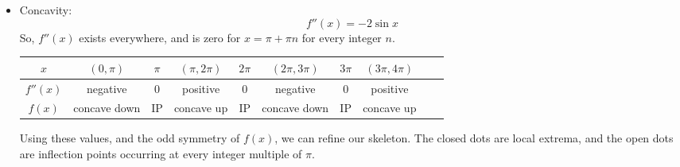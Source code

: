 \begin{solution}
\begin{itemize}
\item Concavity:
\[f''(x)=-2\sin x\]
So, $f''(x)$ exists everywhere, and is zero for $x=\pi+\pi n$ for every integer $n$.
\begin{center}
\begin{tabular}{|c||c|c|c|c|c|c|c|c|c|}
\hline
$x$&$\left(0,\pi\right)$&$\pi$&$\left(\pi,2\pi\right)$
&$2\pi$&$\left(2\pi,3\pi\right)$
&$3\pi$&$\left(3\pi,4\pi\right)$\\
\hline
$f''(x)$&negative&0&positive&0&negative&0&positive\\
\hline
$f(x)$&concave down & IP & concave up & IP & concave down & IP & concave up\\
\hline
\end{tabular}
\end{center}
Using these values, and the odd symmetry of $f(x)$, we can refine our skeleton. The closed dots are local extrema, and the open dots are inflection points occurring at every integer multiple of $\pi$.
\begin{center}\end{center}
\end{itemize}
\end{solution}


